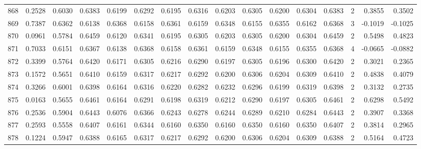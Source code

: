 \begin{tabular}{lrrrrrrrrrrrrrrr}
868 &      0.2528 &  0.6030 &  0.6383 &  0.6199 &  0.6292 &  0.6195 &  0.6316 &  0.6203 &  0.6305 &  0.6200 &   0.6304 &     0.6383 &      2 &                    0.3855 &                     0.3502 \\
869 &      0.7387 &  0.6362 &  0.6138 &  0.6368 &  0.6158 &  0.6361 &  0.6159 &  0.6348 &  0.6155 &  0.6355 &   0.6162 &     0.6368 &      3 &                   -0.1019 &                    -0.1025 \\
870 &      0.0961 &  0.5784 &  0.6459 &  0.6120 &  0.6341 &  0.6195 &  0.6305 &  0.6203 &  0.6305 &  0.6200 &   0.6304 &     0.6459 &      2 &                    0.5498 &                     0.4823 \\
871 &      0.7033 &  0.6151 &  0.6367 &  0.6138 &  0.6368 &  0.6158 &  0.6361 &  0.6159 &  0.6348 &  0.6155 &   0.6355 &     0.6368 &      4 &                   -0.0665 &                    -0.0882 \\
872 &      0.3399 &  0.5764 &  0.6420 &  0.6171 &  0.6305 &  0.6216 &  0.6290 &  0.6197 &  0.6305 &  0.6196 &   0.6300 &     0.6420 &      2 &                    0.3021 &                     0.2365 \\
873 &      0.1572 &  0.5651 &  0.6410 &  0.6159 &  0.6317 &  0.6217 &  0.6292 &  0.6200 &  0.6306 &  0.6204 &   0.6309 &     0.6410 &      2 &                    0.4838 &                     0.4079 \\
874 &      0.3266 &  0.6001 &  0.6398 &  0.6164 &  0.6316 &  0.6220 &  0.6282 &  0.6232 &  0.6296 &  0.6199 &   0.6319 &     0.6398 &      2 &                    0.3132 &                     0.2735 \\
875 &      0.0163 &  0.5655 &  0.6461 &  0.6164 &  0.6291 &  0.6198 &  0.6319 &  0.6212 &  0.6290 &  0.6197 &   0.6305 &     0.6461 &      2 &                    0.6298 &                     0.5492 \\
876 &      0.2536 &  0.5904 &  0.6443 &  0.6076 &  0.6366 &  0.6243 &  0.6278 &  0.6244 &  0.6289 &  0.6210 &   0.6284 &     0.6443 &      2 &                    0.3907 &                     0.3368 \\
877 &      0.2593 &  0.5558 &  0.6407 &  0.6161 &  0.6344 &  0.6160 &  0.6350 &  0.6160 &  0.6350 &  0.6160 &   0.6350 &     0.6407 &      2 &                    0.3814 &                     0.2965 \\
878 &      0.1224 &  0.5947 &  0.6388 &  0.6165 &  0.6317 &  0.6217 &  0.6292 &  0.6200 &  0.6306 &  0.6204 &   0.6309 &     0.6388 &      2 &                    0.5164 &                     0.4723 \\

\end{tabular}
